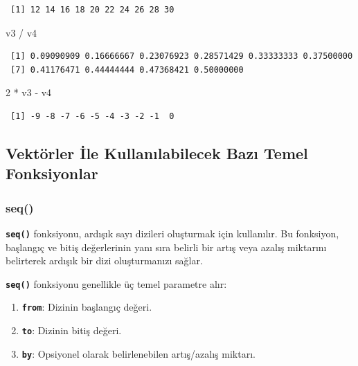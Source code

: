 \documentclass[
  letterpaper,
  DIV=11,
  numbers=noendperiod]{scrreprt}
\newenvironment{Shaded}{\begin{snugshade}}{\end{snugshade}}
\newcommand{\DecValTok}[1]{\textcolor[rgb]{0.68,0.00,0.00}{#1}}
\newcommand{\NormalTok}[1]{\textcolor[rgb]{0.00,0.23,0.31}{#1}}
\newcommand{\SpecialCharTok}[1]{\textcolor[rgb]{0.37,0.37,0.37}{#1}}
\begin{document}
\begin{verbatim}
 [1] 12 14 16 18 20 22 24 26 28 30
\end{verbatim}

\begin{Shaded}
\begin{Highlighting}[]
\NormalTok{v3 }\SpecialCharTok{/}\NormalTok{ v4}
\end{Highlighting}
\end{Shaded}

\begin{verbatim}
 [1] 0.09090909 0.16666667 0.23076923 0.28571429 0.33333333 0.37500000
 [7] 0.41176471 0.44444444 0.47368421 0.50000000
\end{verbatim}

\begin{Shaded}
\begin{Highlighting}[]
\DecValTok{2} \SpecialCharTok{*}\NormalTok{ v3 }\SpecialCharTok{{-}}\NormalTok{ v4}
\end{Highlighting}
\end{Shaded}

\begin{verbatim}
 [1] -9 -8 -7 -6 -5 -4 -3 -2 -1  0
\end{verbatim}

\hypertarget{vektuxf6rler-ile-kullanux131labilecek-bazux131-temel-fonksiyonlar}{%
\subsection{Vektörler İle Kullanılabilecek Bazı Temel
Fonksiyonlar}\label{vektuxf6rler-ile-kullanux131labilecek-bazux131-temel-fonksiyonlar}}

\hypertarget{seq}{%
\subsubsection{seq()}\label{seq}}

\textbf{\texttt{seq()}} fonksiyonu, ardışık sayı dizileri oluşturmak
için kullanılır. Bu fonksiyon, başlangıç ve bitiş değerlerinin yanı sıra
belirli bir artış veya azalış miktarını belirterek ardışık bir dizi
oluşturmanızı sağlar.

\textbf{\texttt{seq()}} fonksiyonu genellikle üç temel parametre alır:

\begin{enumerate}
\def\labelenumi{\arabic{enumi}.}
\item
  \textbf{\texttt{from}}: Dizinin başlangıç değeri.
\item
  \textbf{\texttt{to}}: Dizinin bitiş değeri.
\item
  \textbf{\texttt{by}}: Opsiyonel olarak belirlenebilen artış/azalış
  miktarı.
\end{enumerate}
\end{document}
